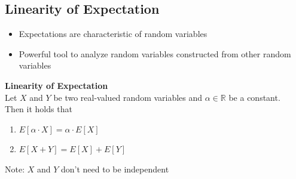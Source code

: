 		\subsection{Linearity of Expectation}
			\begin{itemize}
				\item Expectations are characteristic of random variables
				\item Powerful tool to analyze random variables constructed from other random variables
			\end{itemize}
			\textbf{Linearity of Expectation}\\
			Let $X$ and $Y$ be two real-valued random variables and $\alpha \in \mathbb{R}$ be a constant.\\
			Then it holds that
			\begin{enumerate}
				\item $E[\alpha \cdot X] = \alpha \cdot E[X]$
				\item $E[X+Y] = E[X]+E[Y]$
			\end{enumerate}
			Note: $X$ and $Y$ don't need to be independent
			
